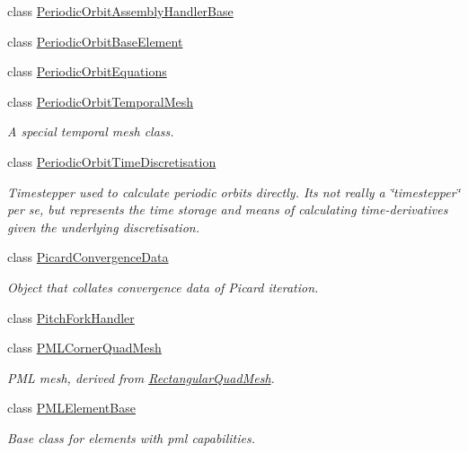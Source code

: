 \begin{DoxyCompactItemize}
\item 
class \hyperlink{classoomph_1_1PeriodicOrbitAssemblyHandlerBase}{Periodic\+Orbit\+Assembly\+Handler\+Base}
\item 
class \hyperlink{classoomph_1_1PeriodicOrbitBaseElement}{Periodic\+Orbit\+Base\+Element}
\item 
class \hyperlink{classoomph_1_1PeriodicOrbitEquations}{Periodic\+Orbit\+Equations}
\item 
class \hyperlink{classoomph_1_1PeriodicOrbitTemporalMesh}{Periodic\+Orbit\+Temporal\+Mesh}
\begin{DoxyCompactList}\small\item\em A special temporal mesh class. \end{DoxyCompactList}\item 
class \hyperlink{classoomph_1_1PeriodicOrbitTimeDiscretisation}{Periodic\+Orbit\+Time\+Discretisation}
\begin{DoxyCompactList}\small\item\em Timestepper used to calculate periodic orbits directly. It\textquotesingle{}s not really a \char`\"{}timestepper\char`\"{} per se, but represents the time storage and means of calculating time-\/derivatives given the underlying discretisation. \end{DoxyCompactList}\item 
class \hyperlink{classoomph_1_1PicardConvergenceData}{Picard\+Convergence\+Data}
\begin{DoxyCompactList}\small\item\em Object that collates convergence data of Picard iteration. \end{DoxyCompactList}\item 
class \hyperlink{classoomph_1_1PitchForkHandler}{Pitch\+Fork\+Handler}
\item 
class \hyperlink{classoomph_1_1PMLCornerQuadMesh}{P\+M\+L\+Corner\+Quad\+Mesh}
\begin{DoxyCompactList}\small\item\em P\+ML mesh, derived from \hyperlink{classoomph_1_1RectangularQuadMesh}{Rectangular\+Quad\+Mesh}. \end{DoxyCompactList}\item 
class \hyperlink{classoomph_1_1PMLElementBase}{P\+M\+L\+Element\+Base}
\begin{DoxyCompactList}\small\item\em Base class for elements with pml capabilities. \end{DoxyCompactList}\item 

\end{DoxyCompactItemize}
